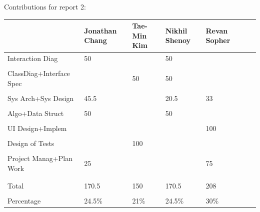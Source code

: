\documentclass[letterpaper,english, 12pt]{scrreprt}
\begin{document}
Contributions for report 2:\\
\begin{center}
	\begin{tabular}{|l|C{2cm}|C{2cm}|C{2cm}|C{2cm}|C{2cm}|C{2cm}|}
		\hline
                        & Jonathan Chang& Tae-Min Kim   & Nikhil Shenoy & Revan Sopher  \\ \hline
Interaction Diag        &      50       &               &      50       &               \\ \hline
                        &               &               &               &               \\ \hline
ClassDiag+Interface Spec&               &      50       &      50       &               \\ \hline
                        &               &               &               &               \\ \hline
Sys Arch+Sys Design     &      45.5     &               &      20.5     &     33        \\ \hline
                        &               &               &               &               \\ \hline
Algo+Data Struct        &      50       &               &      50       &               \\ \hline
                        &               &               &               &               \\ \hline
UI Design+Implem        &               &               &               &    100        \\ \hline
                        &               &               &               &               \\ \hline
Design of Tests         &               &      100      &               &               \\ \hline
                        &               &               &               &               \\ \hline
Project Manag+Plan Work &      25       &               &               &     75        \\ \hline
                        &               &               &               &               \\ \hline

                        &               &               &               &               \\ \hline
Total                   &     170.5     &      150      &     170.5     &    208        \\ \hline
                        &               &               &               &               \\ \hline
Percentage              &      24.5\%   &      21\%     &      24.5\%     &     30\%      \\ \hline
	\end{tabular}
\end{center}
\end{document}
